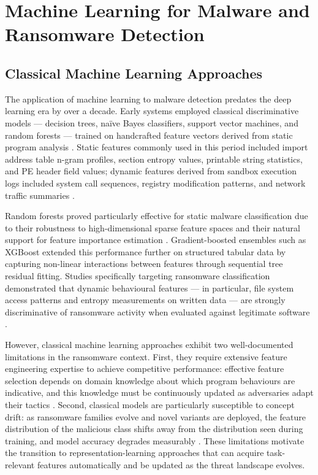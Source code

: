 \section{Machine Learning for Malware and Ransomware Detection}
\label{sec:lit_ml}

\subsection{Classical Machine Learning Approaches}
\label{sec:lit_classical}

The application of machine learning to malware detection predates the deep learning era by
over a decade.
Early systems employed classical discriminative models — decision trees, na\"{i}ve Bayes
classifiers, support vector machines, and random forests — trained on handcrafted feature
vectors derived from static program analysis \cite{sarker2020cybersecurity}.
Static features commonly used in this period included import address table n-gram profiles,
section entropy values, printable string statistics, and PE header field values; dynamic
features derived from sandbox execution logs included system call sequences, registry
modification patterns, and network traffic summaries \cite{sikorski2012practical}.

Random forests proved particularly effective for static malware classification due to their
robustness to high-dimensional sparse feature spaces and their natural support for feature
importance estimation \cite{fernando2020study}.
Gradient-boosted ensembles such as XGBoost \cite{chen2016xgboost} extended this performance
further on structured tabular data by capturing non-linear interactions between features
through sequential tree residual fitting.
Studies specifically targeting ransomware classification demonstrated that dynamic behavioural
features — in particular, file system access patterns and entropy measurements on written
data — are strongly discriminative of ransomware activity when evaluated against legitimate
software \cite{SgandurraMML16, krishna2020comparative}.

However, classical machine learning approaches exhibit two well-documented limitations in the
ransomware context.
First, they require extensive feature engineering expertise to achieve competitive performance:
effective feature selection depends on domain knowledge about which program behaviours are
indicative, and this knowledge must be continuously updated as adversaries adapt their
tactics \cite{razaulla2023age, gibert2020rise}.
Second, classical models are particularly susceptible to concept drift: as ransomware families
evolve and novel variants are deployed, the feature distribution of the malicious class shifts
away from the distribution seen during training, and model accuracy degrades
measurably \cite{Ceschin2022ConceptDrift, Fernando2024FeSAD}.
These limitations motivate the transition to representation-learning approaches that can
acquire task-relevant features automatically and be updated as the threat landscape evolves.

